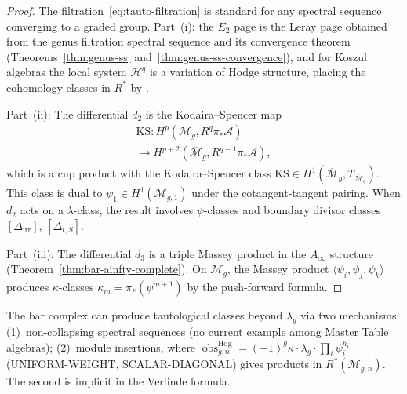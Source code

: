 \begin{proof}
The filtration~\eqref{eq:tauto-filtration} is standard for any
spectral sequence converging to a graded group. Part~(i): the
$E_2$ page is the Leray page obtained from the genus filtration
spectral sequence and its convergence theorem
(Theorems~\ref{thm:genus-ss} and~\ref{thm:genus-ss-convergence}),
and for Koszul
algebras the local system $\mathcal{H}^q$ is a variation of Hodge
structure, placing the cohomology classes in $R^*$ by
\cite[Appendix~A]{FP00}.

Part~(ii): The differential $d_2$ is the Kodaira--Spencer map
\begin{multline*}
\mathrm{KS}\colon H^p(\overline{\mathcal{M}}_g, R^q\pi_*\mathcal{A}) \\
\to H^{p+2}(\overline{\mathcal{M}}_g, R^{q-1}\pi_*\mathcal{A}),
\end{multline*}
which is a cup product with the Kodaira--Spencer class
$\mathrm{KS} \in H^1(\overline{\mathcal{M}}_g,
T_{\overline{\mathcal{M}}_g})$. This class is dual to
$\psi_1 \in H^1(\overline{\mathcal{M}}_{g,1})$ under the
cotangent-tangent pairing. When $d_2$ acts on a $\lambda$-class,
the result involves $\psi$-classes and boundary divisor classes
$[\Delta_{\mathrm{irr}}]$, $[\Delta_{i,S}]$.

Part~(iii): The differential $d_3$ is a triple Massey product in
the $A_\infty$ structure (Theorem~\ref{thm:bar-ainfty-complete}).
On $\overline{\mathcal{M}}_g$, the Massey product
$\langle \psi_i, \psi_j, \psi_k \rangle$ produces
$\kappa$-classes $\kappa_m = \pi_*(\psi^{m+1})$ by the
push-forward formula.
\end{proof}

\begin{remark}
\label{rem:tauto-beyond-lambda}
The bar complex can produce tautological classes beyond $\lambda_g$
via two mechanisms: (1)~non-collapsing spectral sequences (no
current example among Master Table algebras); (2)~module insertions,
where $\operatorname{obs}^{\mathrm{Hdg}}_{g,n}
=(-1)^g\kappa\cdot\lambda_g\cdot
\prod_i\psi_i^{h_i}$
\textup{(}UNIFORM-WEIGHT, SCALAR-DIAGONAL\textup{)} gives products in
$R^*(\overline{\mathcal{M}}_{g,n})$.
The second is implicit in the Verlinde formula.
\end{remark}

